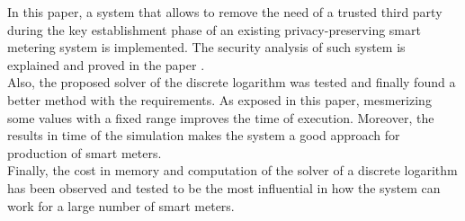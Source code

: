 
	In this paper, a system that allows to remove the need of a trusted
	third party during the key establishment phase of an existing privacy-preserving smart metering system is implemented. The security analysis of such system is explained and proved in the paper \cite{recsi}.\\

	Also, the proposed solver of the discrete logarithm was tested and finally
	found a better method with the requirements. As exposed in this paper, mesmerizing some values with a fixed range improves the time of execution.
	Moreover, the results in time of the simulation makes the system a good approach for production of smart meters.\\
	
	Finally, the cost in memory and computation of the solver of a discrete
	logarithm has been observed and tested to be the most influential in how
	the system can work for a large number of smart meters.
	
	
